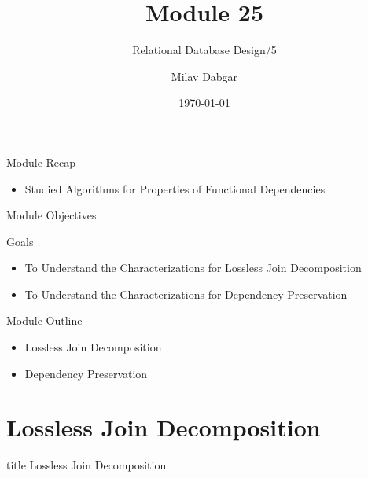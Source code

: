 \documentclass[aspectratio=169, xcolor=dvipsnames]{beamer}
\title{Module 25}
\subtitle{Relational Database Design/5}
\author{Milav Dabgar}
\institute{www.milav.in}
\date{\today}
\begin{document}
\begin{frame}
    \titlepage
\end{frame}

\begin{frame}{Module Recap}
    \begin{itemize}[<+->]
        \item Studied Algorithms for Properties of Functional Dependencies
    \end{itemize}
\end{frame}

\begin{frame}{Module Objectives}
    \begin{block}{Goals}
        \begin{itemize}[<+->]
            \item To Understand the Characterizations for Lossless Join Decomposition
            \item To Understand the Characterizations for Dependency Preservation
        \end{itemize}
    \end{block}
\end{frame}

\begin{frame}{Module Outline}
    \begin{itemize}[<+->]
        \item Lossless Join Decomposition
        \item Dependency Preservation
    \end{itemize}
\end{frame}

\section{Lossless Join Decomposition}
\begin{frame}
  \vfill
  \centering
  \begin{beamercolorbox}[sep=8pt,center,shadow=true,rounded=true]{title}
    Lossless Join Decomposition\par%
  \end{beamercolorbox}
  \vfill
\end{frame}
\end{document}
